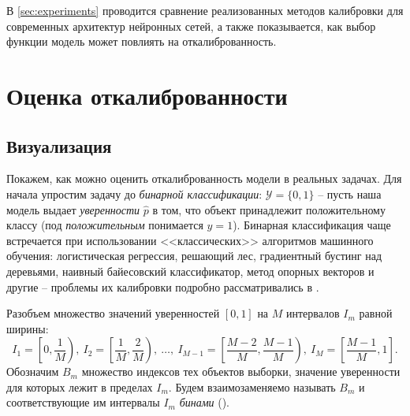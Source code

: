 \documentclass[12pt]{article}
\begin{document}
В \autoref{sec:experiments} проводится сравнение реализованных методов калибровки для современных архитектур нейронных сетей, а также показывается, как выбор функции модель может повлиять на откалиброванность.


\section{Оценка откалиброванности}\label{sec:estimate}
\subsection{Визуализация}
Покажем, как можно оценить откалиброванность модели в реальных задачах. Для начала упростим задачу до \emph{бинарной классификации}: $\mathcal{Y}=\{0,1\}$ -- пусть наша модель выдает \emph{уверенности} $\hat{p}$ в том, что объект принадлежит положительному классу (под \emph{положительным} понимается $y=1$). Бинарная классификация чаще встречается при использовании <<классических>> алгоритмов машинного обучения: логистическая регрессия, решающий лес, градиентный бустинг над деревьями, наивный байесовский классификатор, метод опорных векторов и другие -- проблемы их калибровки подробно рассматривались в \cite{good_proba, emp_comparison}.


Разобъем множество значений уверенностей $[0, 1]$ на $M$ интервалов $I_m$ равной ширины:
\begin{equation}\label{eq:binning}
I_1= \left[0, \frac{1}{M}\right),\
I_2= \left[\frac{1}{M},\frac{2}{M}\right),\
\dots,\
I_{M-1}= \left[\frac{M-2}{M},\frac{M-1}{M}\right),\
I_{M} = \left[\frac{M-1}{M}, 1\right].
\end{equation}
Обозначим $B_m$ множество индексов тех объектов выборки, значение уверенности для которых лежит в пределах $I_m$. Будем взаимозаменяемо называть $B_m$ и соответствующие им интервалы $I_m$ \emph{бинами} ().
\end{document}
